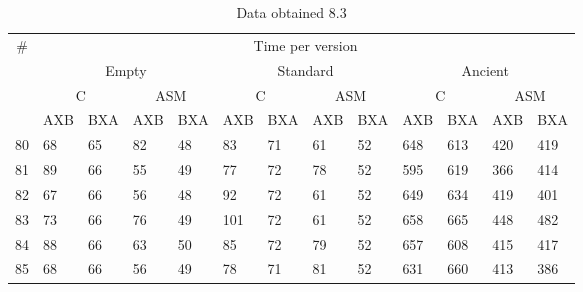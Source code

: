 \documentclass[legalpaper,12pt]{article}
\begin{document}
\begin{table}[h]
\centering
\caption*{Data obtained 8.3}
\begin{tabular}{|l|l|l|l|l|l|l|l|l|l|l|l|l|}
\hline
\multicolumn{1}{|c|}{\multirow{4}{*}{\#}} & \multicolumn{12}{c|}{Time per version}                                                                                                                 \\ \cline{2-13} 
\multicolumn{1}{|c|}{}                    & \multicolumn{4}{c|}{Empty}                       & \multicolumn{4}{c|}{Standard}                    & \multicolumn{4}{c|}{Ancient}                        \\ \cline{2-13} 
\multicolumn{1}{|c|}{}                    & \multicolumn{2}{c|}{C} & \multicolumn{2}{c|}{ASM} & \multicolumn{2}{c|}{C} & \multicolumn{2}{c|}{ASM} & \multicolumn{2}{c|}{C} & \multicolumn{2}{c|}{ASM} \\ \cline{2-13} 
\multicolumn{1}{|c|}{}                    & AXB        & BXA       & AXB         & BXA        & AXB        & BXA       & AXB         & BXA        & AXB        & BXA       & AXB         & BXA        
\\ \hline
80                                        & 68         & 65        & 82          & 48         & 83         & 71        & 61          & 52         & 648        & 613       & 420         & 419        \\ \hline
81                                        & 89         & 66        & 55          & 49         & 77         & 72        & 78          & 52         & 595        & 619       & 366         & 414        \\ \hline
82                                        & 67         & 66        & 56          & 48         & 92         & 72        & 61          & 52         & 649        & 634       & 419         & 401        \\ \hline
83                                        & 73         & 66        & 76          & 49         & 101        & 72        & 61          & 52         & 658        & 665       & 448         & 482        \\ \hline
84                                        & 88         & 66        & 63          & 50         & 85         & 72        & 79          & 52         & 657        & 608       & 415         & 417        \\ \hline
85                                        & 68         & 66        & 56          & 49         & 78         & 71        & 81          & 52         & 631        & 660       & 413         & 386        \\ \hline

\end{tabular}
\end{table}
\end{document}
